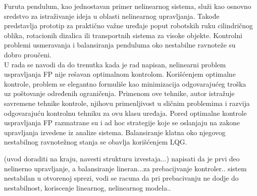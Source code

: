 \documentclass[a4paper,11pt]{article}
\theoremstyle{definition} \newtheorem{deff}{Definicija}[section]
\theoremstyle{definition} \newtheorem{prim}[deff]{Primer}
\theoremstyle{plain} \newtheorem{teor}[deff]{Teorema}
\begin{document}
	
	
	Furuta pendulum, kao jednostavan primer nelinearnog sistema, služi kao osnovno sredstvo za istraživanje ideja u oblasti nelinearnog upravljanja. Takođe predstavlja prototip za praktično važne uređaje poput robotskih ruku cilindričnog oblika, rotacionih dizalica ili transportnih sistema za visoke objekte. Kontrolni problemi usmeravanja i balansiranja penduluma oko nestabilne ravnoteže su dobro proučeni.\\
	
	U rada \cite{inicijalna} se navodi da do trenutka kada je rad napisan, nelinearni problem uspravljanja FP nije rešavan optimalnom kontrolom. Korišćenjem optimalne kontrole, problem se elegantno formuliše kao minimizacija odgovarajućeg troška uz poštovanje određenih ograničenja. Primenom ove tehnike, autor istražuje savremene tehnike kontrole, njihovu primenljivost u sličnim problemima i razvija odgovarajuću kontrolnu tehniku za ovu klasu uređaja. Pored optimalne kontrole uspravljanja FP razmatrane su i ad hoc strategije koje se oslanjaju na zakone upravljanja izvedene iz analize sistema. Balansiranje klatna oko njegovog nestabilnog ravnotežnog stanja se obavlja korišćenjem LQG. 
	
	(uvod doraditi na kraju, navesti strukturu izvestaja...) napisati da je prvi deo nelinerno upravljanje, a balansiranje lineran...za prebacijvanje kontroler.. sistem nestabilan u otvorenoj sprezi, vodi se racuna da  pri prebacivanju ne dodje do nestabilnost, koriscenje linearnog, nelinearnog modela..
	
	\newpage
	
\end{document}
